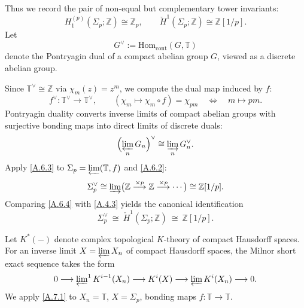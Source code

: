 \documentclass[11pt]{article}
\theoremstyle{remark}
\begin{document}
Thus we record the pair of non-equal but complementary tower invariants:
\begin{equation}
H^{(p)}_{1}(\Sigma_{p};\mathbb Z)\cong \mathbb Z_{p},
\qquad
\check{H}^{1}(\Sigma_{p};\mathbb Z)\cong \mathbb Z[1/p].
\label{A.5.2}
\end{equation}
Let
\begin{equation}
G^{\vee}:=\mathrm{Hom}_{\mathrm{cont}}(G,\mathbb T)
\label{A.6.1}
\end{equation}
denote the Pontryagin dual of a compact abelian group $G$, viewed as a discrete abelian group.

Since $\mathbb T^{\vee}\cong\mathbb Z$ via $\chi_{m}(z)=z^{m}$, we compute the dual map induced by $f$:
\begin{equation}
f^{\vee}:\mathbb T^{\vee}\to\mathbb T^{\vee},
\qquad
(\chi_{m}\mapsto \chi_{m}\circ f)=\chi_{pm}
\quad\Longleftrightarrow\quad
m\mapsto pm.
\label{A.6.2}
\end{equation}
Pontryagin duality converts inverse limits of compact abelian groups with surjective bonding maps into direct limits of discrete duals:
\begin{equation}
\Bigl(\varprojlim_{n}G_{n}\Bigr)^{\vee}\cong\varinjlim_{n}G_{n}^{\vee}.
\label{A.6.3}
\end{equation}
Apply \eqref{A.6.3} to $\Sigma_{p}=\varprojlim(\mathbb T,f)$ and \eqref{A.6.2}:
\begin{equation}
\Sigma_{p}^{\vee}
\cong
\varinjlim\bigl(\mathbb Z\overset{\times p}{\longrightarrow}\mathbb Z\overset{\times p}{\longrightarrow}\cdots\bigr)
\cong
\mathbb Z[1/p].
\label{A.6.4}
\end{equation}
Comparing \eqref{A.6.4} with \eqref{A.4.3} yields the canonical identification
\begin{equation}
\Sigma_{p}^{\vee}\ \cong\ \check{H}^{1}(\Sigma_{p};\mathbb Z)\ \cong\ \mathbb Z[1/p].
\label{A.6.5}
\end{equation}

Let $K^{*}(-)$ denote complex topological $K$-theory of compact Hausdorff spaces. For an inverse limit $X=\varprojlim X_{n}$ of compact Hausdorff spaces, the Milnor short exact sequence takes the form
\begin{equation}
0\longrightarrow \varprojlim\nolimits^{1} K^{i-1}(X_{n})
\longrightarrow K^{i}(X)
\longrightarrow \varprojlim K^{i}(X_{n})
\longrightarrow 0.
\label{A.7.1}
\end{equation}
We apply \eqref{A.7.1} to $X_{n}=\mathbb T$, $X=\Sigma_{p}$, bonding maps $f:\mathbb T\to\mathbb T$.
\end{document}
